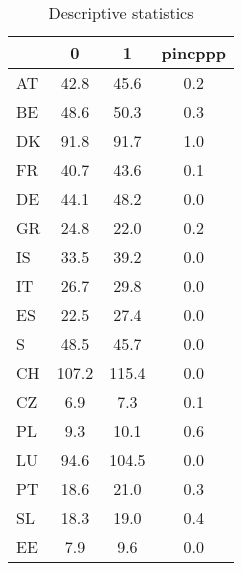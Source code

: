 \begin{table}[htbp]
\caption{\label{clabel} Descriptive statistics}\centering\medskip
\begin{tabular}{lccc} \hline \hline
 & 0  & 1  & pincppp  \\  \hline 
AT &      42.8 &      45.6 &       0.2 \\  
BE &      48.6 &      50.3 &       0.3 \\  
DK &      91.8 &      91.7 &       1.0 \\  
FR &      40.7 &      43.6 &       0.1 \\  
DE &      44.1 &      48.2 &       0.0 \\  
GR &      24.8 &      22.0 &       0.2 \\  
IS &      33.5 &      39.2 &       0.0 \\  
IT &      26.7 &      29.8 &       0.0 \\  
ES &      22.5 &      27.4 &       0.0 \\  
S &      48.5 &      45.7 &       0.0 \\  
CH &     107.2 &     115.4 &       0.0 \\  
CZ &       6.9 &       7.3 &       0.1 \\  
PL &       9.3 &      10.1 &       0.6 \\  
LU &      94.6 &     104.5 &       0.0 \\  
PT &      18.6 &      21.0 &       0.3 \\  
SL &      18.3 &      19.0 &       0.4 \\  
EE &       7.9 &       9.6 &       0.0 \\  
\hline \hline \end{tabular}
\end{table}
